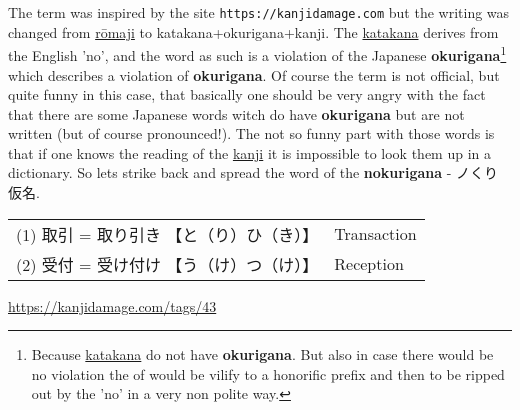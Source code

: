 The term  was inspired by
the site \texttt{https://kanjidamage.com} but the writing was changed from
\hyperref[sec:Romaji]{rōmaji} to katakana+okurigana+kanji.  The
\hyperref[sec:Katakana]{katakana}  derives from the English
'no', and the word as such is a violation of the Japanese
\textbf{okurigana}\footnote{

Because \hyperref[sec:Katakana]{katakana} do not have \textbf{okurigana}. But
also in case there would be no violation the  of  would be
vilify to a honorific prefix and then to be ripped out by the 'no' in a very
non polite way.

} which describes a violation of \textbf{okurigana}.  Of course the term  is
not official, but quite funny in this case, that basically one should be very
angry with the fact that there are some Japanese words witch do have
\textbf{okurigana} but are not written (but of course pronounced!). The not so
funny part with those words is that if one knows the reading of the
\hyperref[sec:Kanji]{kanji} it is impossible to look them up in a dictionary.
So lets strike back and spread the word of the \textbf{nokurigana} -
{ノくり仮名}.

\begin{center}\begin{tabular}{ll}
(1) {取引} = {取り引き} {【と（り）ひ（き）】} &  Transaction\\
(2) {受付} = {受け付け} {【う（け）つ（け）】} &  Reception\\
\end{tabular}\end{center}


\Link \href{https://kanjidamage.com/tags/43}{https://kanjidamage.com/tags/43}








